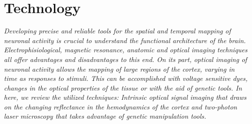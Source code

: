 \chapter{Technology}
\label{cap:Technology}

\textit{Developing precise and reliable tools for the spatial and temporal mapping of neuronal activity is crucial to understand the functional architecture of the brain. Electrophisiological, magnetic resonance, anatomic and optical imaging techniques all offer advantages and disadvantages to this end. On its part, optical imaging of neuronal activity allows the mapping of large regions of the cortex, varying in time as responses to stimuli. This can be accomplished with voltage sensitive dyes, changes in the optical properties of the tissue or with the aid of genetic tools. In here, we review the utilized techniques: Intrinsic optical signal imaging that draws on the changing reflectance in the hemodynamics of the cortex and two-photon laser microscopy that takes advantage of genetic manipulation tools.}





